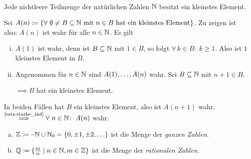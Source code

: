 \documentclass[../ana1.tex]{subfiles}
\begin{document}
\begin{satz}\label{satz:wohlordprinz} \leavevmode \\
	Jede nichtleere Teilmenge der natürlichen Zahlen \(\mathbb{N} \) besitzt ein kleinstes Element.
\end{satz}
\begin{bew}
	Sei \(A(n)\coloneqq \set{\forall \, \emptyset \neq B \subseteq \N \text{ mit } n \in B \text{ hat ein kleinstes Element}} \).
	Zu zeigen ist also: \(A(n) \) ist wahr für alle \(n \in \mathbb{N} \). Es gilt
	\begin{enumerate}[(i)]
		\item \(A(1) \) ist wahr, denn ist \(B \subseteq \mathbb{N} \) mit \(1 \in B \), so folgt \(\forall \, k \in B \colon \; k \geq 1 \).
			  Also ist \(1 \) kleinstes Element in \(B \).
		\item Angenommen für \(n \in \mathbb{N} \) sind \(A(1) , \ldots , A(n) \) wahr. Sei \(B \subseteq \mathbb{N} \) mit \(n + 1 \in B \).
		      \(\implies B \) hat ein kleinstes Element.
	\end{enumerate}
	In beiden Fällen hat \(B \) ein kleinstes Element, also ist \(A(n+1) \) wahr.\\
	\(\overset{\text{\autoref{satz:starke_ind}}}{\implies} \forall \, n \in \N \colon \; A(n) \) wahr.
\end{bew}

\iftoggle{short}{}{\newpage}%

\begin{notation}\leavevmode
	\begin{enumerate}[(a)]
		\item \(\Z \coloneqq \minus \N \cup \N_0 = \set{0 \ko \pm 1 \ko \pm 2  \ko \ldots} \) ist die Menge der \textit{ganzen Zahlen}.
		\item \(\mathbb{Q} \coloneqq \{\frac{m}{n} \; \vert \; n \in \mathbb{N} , m \in \mathbb{Z} \} \) ist die Menge der \textit{rationalen Zahlen}.
	\end{enumerate}
\end{notation}
\end{document}
